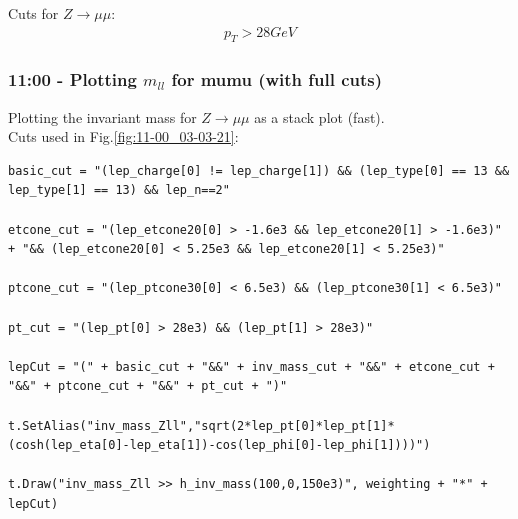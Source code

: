 Cuts for $Z \rightarrow \mu\mu$:
\begin{align}
    p_T > 28 GeV    
\end{align}

\subsubsection*{11:00 - Plotting $m_{ll}$ for mumu (with full cuts)}
Plotting the invariant mass for $Z \rightarrow \mu\mu$ as a stack plot (fast).
\\
Cuts used in Fig.\ref{fig:11-00_03-03-21}:
\begin{lstlisting}
basic_cut = "(lep_charge[0] != lep_charge[1]) && (lep_type[0] == 13 && lep_type[1] == 13) && lep_n==2"
   
etcone_cut = "(lep_etcone20[0] > -1.6e3 && lep_etcone20[1] > -1.6e3)" + "&& (lep_etcone20[0] < 5.25e3 && lep_etcone20[1] < 5.25e3)"

ptcone_cut = "(lep_ptcone30[0] < 6.5e3) && (lep_ptcone30[1] < 6.5e3)"

pt_cut = "(lep_pt[0] > 28e3) && (lep_pt[1] > 28e3)"
    
lepCut = "(" + basic_cut + "&&" + inv_mass_cut + "&&" + etcone_cut + "&&" + ptcone_cut + "&&" + pt_cut + ")"

t.SetAlias("inv_mass_Zll","sqrt(2*lep_pt[0]*lep_pt[1]*(cosh(lep_eta[0]-lep_eta[1])-cos(lep_phi[0]-lep_phi[1])))")
  
t.Draw("inv_mass_Zll >> h_inv_mass(100,0,150e3)", weighting + "*" + lepCut)
\end{lstlisting}
